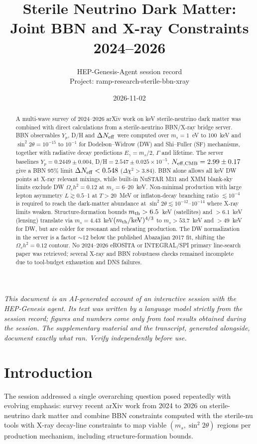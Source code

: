 \documentclass[11pt,a4paper]{article}
\title{Sterile Neutrino Dark Matter: Joint BBN and X-ray Constraints 2024--2026}
\author{HEP-Genesis-Agent session record \\ \small Project: ramp-research-sterile-bbn-xray}
\date{2026-11-02}
\begin{document}
\maketitle
\noindent\textit{\small This document is an AI-generated account of an interactive session with the HEP-Genesis agent. Its text was written by a language model strictly from the session record; figures and numbers come only from tool results obtained during the session. The supplementary material and the transcript, generated alongside, document exactly what ran. Verify independently before use.}
\vspace{1em}

\begin{abstract}
A multi-wave survey of 2024--2026 arXiv work on keV sterile-neutrino dark matter was combined with direct calculations from a sterile-neutrino BBN/X-ray bridge server. BBN observables $Y_{p}$, D/H and $\Delta N_{\rm eff}$ were computed over $m_{s}=1$~eV to 100~keV and $\sin^{2}2\theta=10^{-15}$ to $10^{-1}$ for Dodelson--Widrow (DW) and Shi--Fuller (SF) mechanisms, together with radiative decay predictions $E_{\gamma}=m_{s}/2$, $\Gamma$ and lifetime. The server baselines $Y_{p}=0.2449\pm0.004$, D/H$=2.547\pm0.025\times10^{-5}$, $N_{\rm eff,CMB}=2.99\pm0.17$ give a BBN 95\% limit $\Delta N_{\rm eff}<0.548$ ($\Delta\chi^{2}>3.84$). BBN alone allows all keV DW points at X-ray relevant mixings, while built-in NuSTAR M31 and XMM blank-sky limits exclude DW $\Omega_{s}h^{2}=0.12$ at $m_{s}=6$--20~keV. Non-minimal production with large lepton asymmetry $L\gtrsim0.5$--1 at $T>20$~MeV or inflaton-decay branching ratio $\lesssim10^{-4}$ is required to reach the dark-matter abundance at $\sin^{2}2\theta\lesssim10^{-12}$--$10^{-14}$ where X-ray limits weaken. Structure-formation bounds $m_{\rm th}>6.5$~keV (satellites) and $>6.1$~keV (lensing) translate via $m_{s}=4.43$~keV$(m_{\rm th}/{\rm keV})^{4/3}$ to $m_{s}>53.7$~keV and $>49$~keV for DW, but are colder for resonant and reheating production. The DW normalization in the server is a factor $\sim12$ below the published Abazajian 2017 fit, shifting the $\Omega_{s}h^{2}=0.12$ contour. No 2024--2026 eROSITA or INTEGRAL/SPI primary line-search paper was retrieved; several X-ray and BBN robustness checks remained incomplete due to tool-budget exhaustion and DNS failures.
\end{abstract}

\section{Introduction}
The session addressed a single overarching question posed repeatedly with evolving emphasis: survey recent arXiv work from 2024 to 2026 on sterile-neutrino dark matter and combine BBN constraints computed with the sterile-nu tools with X-ray decay-line constraints to map viable $(m_{s},\sin^{2}2\theta)$ regions per production mechanism, including structure-formation bounds.
\end{document}
